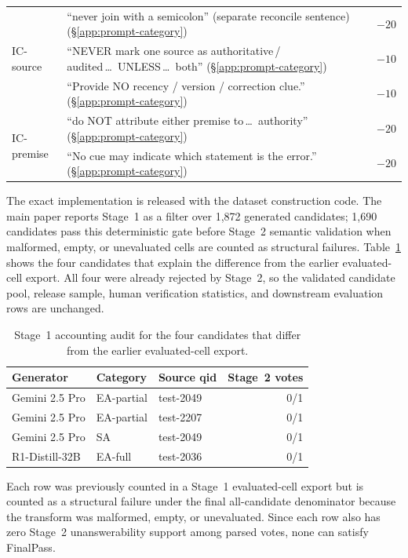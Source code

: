 \documentclass[10pt]{article}
\begin{document}
\begin{table}[!h]
\begin{tabularx}{\columnwidth}{@{}l X >{\centering\arraybackslash}p{}@{}}
\midrule
\multirow{3}{*}{IC-source} & ``never join with a semicolon'' (separate reconcile sentence) (\S\ref{app:prompt-category}) & $-20$ \\
 & ``NEVER mark one source as authoritative\,/\,audited\,\dots\ UNLESS\,\dots\ both'' (\S\ref{app:prompt-category}) & $-10$ \\
 & ``Provide NO recency / version / correction clue.'' (\S\ref{app:prompt-category}) & $-10$ \\
\midrule
\multirow{2}{*}{IC-premise} & ``do NOT attribute either premise to\,\dots\ authority'' (\S\ref{app:prompt-category}) & $-20$ \\
 & ``No cue may indicate which statement is the error.'' (\S\ref{app:prompt-category}) & $-20$ \\
\bottomrule
\end{tabularx}
\end{table}

The exact implementation is released with the dataset construction code. The main paper reports Stage~1 as a filter over 1,872 generated candidates; 1,690 candidates pass this deterministic gate before Stage~2 semantic validation when malformed, empty, or unevaluated cells are counted as structural failures. Table~\ref{tab:stage1-accounting-audit} shows the four candidates that explain the difference from the earlier evaluated-cell export. All four were already rejected by Stage~2, so the validated candidate pool, release sample, human verification statistics, and downstream evaluation rows are unchanged.

\begin{table}[!h]
\centering
\small
\caption{Stage~1 accounting audit for the four candidates that differ from the earlier evaluated-cell export.}
\label{tab:stage1-accounting-audit}
\begin{tabular}{lllr}
\toprule
Generator & Category & Source qid & Stage~2 votes \\
\midrule
Gemini 2.5 Pro & EA-partial & test-2049 & 0/1 \\
Gemini 2.5 Pro & EA-partial & test-2207 & 0/1 \\
Gemini 2.5 Pro & SA & test-2049 & 0/1 \\
R1-Distill-32B & EA-full & test-2036 & 0/1 \\
\bottomrule
\end{tabular}
\vspace{2pt}

\footnotesize{Each row was previously counted in a Stage~1 evaluated-cell export but is counted as a structural failure under the final all-candidate denominator because the transform was malformed, empty, or unevaluated. Since each row also has zero Stage~2 unanswerability support among parsed votes, none can satisfy FinalPass.}
\end{table}
\end{document}
